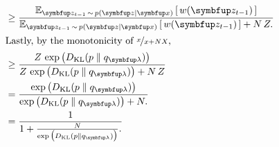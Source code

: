 \begin{proofEnd}
\begin{align}
    &\geq
    \frac{
      \Esub{\vz_{t-1} \,\sim\, p(\vz\mid\vx)}{ w(\vz_{t-1}) }
    }{
      \Esub{\vz_{t-1} \,\sim\, p(\vz\mid\vx)}{ w(\vz_{t-1}) } + N\,Z.
    } \\
\intertext{Lastly, by the monotonicity of \(\nicefrac{x}{x + NX}\),}
    &\geq
    \frac{
      Z\,\exp\big(\DKL{p}{q_{\vlambda}}\big)
    }{
      Z\,\exp\big(\DKL{p}{q_{\vlambda}}\big) + N\,Z
    } \\
    &= \frac{
      \exp\big(\DKL{p}{q_{\vlambda}}\big)
    }{
      \exp\big(\DKL{p}{q_{\vlambda}}\big) + N.
    } \\
    &= \frac{1}{
       1 + \frac{N}{
         \exp\big(\DKL{p}{q_{\vlambda}}\big) 
      }.
    }
  \end{align}
\end{proofEnd}

